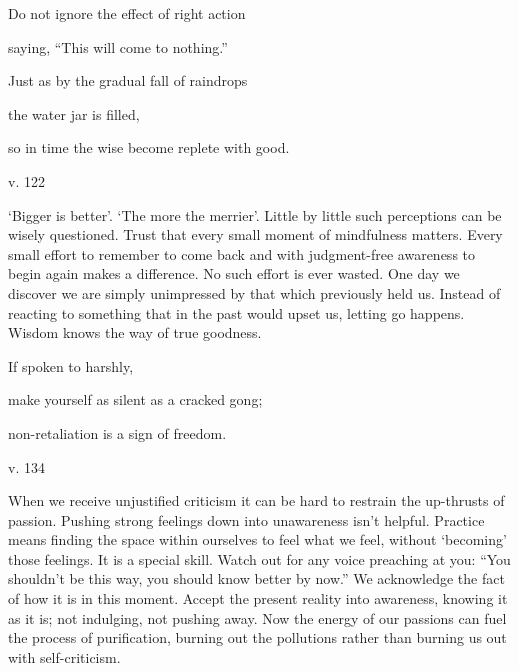 \documentclass[a4paper,portrait,12pt]{article}
\begin{document}
Do not ignore the effect of right action


saying, ``This will come to nothing.''


Just as by the gradual fall of raindrops


the water jar is filled,


so in time the wise become replete with good.





v. 122





 `Bigger is better'. `The more the merrier'. Little by little such perceptions can be wisely questioned. Trust that every small moment of mindfulness matters. Every small effort to remember to come back and with judgment-free awareness to begin again makes a difference. No such effort is ever wasted. One day we discover we are simply unimpressed by that which previously held us. Instead of reacting to something that in the past would upset us, letting go happens. Wisdom knows the way of true goodness.














If spoken to harshly,


make yourself as silent as a cracked gong;


non-retaliation is a sign of freedom.





v. 134


When we receive unjustified criticism it can be hard to restrain the up-thrusts of passion. Pushing strong feelings down into unawareness isn't helpful. Practice means finding the space within ourselves to feel what we feel, without `becoming' those feelings. It is a special skill. Watch out for any voice preaching at you: ``You shouldn't be this way, you should know better by now.'' We acknowledge the fact of how it is in this moment. Accept the present reality into awareness, knowing it as it is; not indulging, not pushing away. Now the energy of our passions can fuel the process of purification, burning out the pollutions rather than burning us out with self-criticism.
\end{document}
